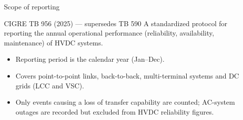 %


\begin{frame}{Scope of reporting}
  \begin{block}{CIGRE TB 956 (2025) — supersedes TB 590}
    A standardized protocol for reporting the annual operational
    performance (reliability, availability, maintenance) of HVDC systems.
  \end{block}
  \vspace{0.4em}
  \begin{itemize}
    \setlength{\itemsep}{0.4em}
    \item Reporting period is the calendar year (Jan–Dec).
    \item Covers point-to-point links, back-to-back, multi-terminal
          systems and DC grids (LCC and VSC).
    \item Only events causing a loss of transfer capability are counted;
          AC-system outages are recorded but excluded from HVDC
          reliability figures.
  \end{itemize}
\end{frame}


